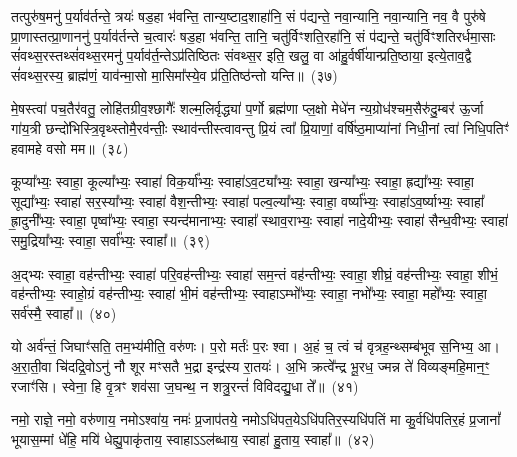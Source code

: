 तत्पुरु॑ष॒मनु॑ प॒र्याव॑र्तन्ते॒ त्रयः॑ षड॒हा भ॑वन्ति॒ तान्य॒ष्टाद॒शाहा॑नि॒ सं प॑द्यन्ते॒ नवा॒न्यानि॒ नवा॒न्यानि॒ नव॒ वै पुरु॑षे प्रा॒णास्तत्प्रा॒णाननु॑ प॒र्याव॑र्तन्ते च॒त्वारः॑ षड॒हा भ॑वन्ति॒ तानि॒ चतु॑र्विꣳशति॒रहा॑नि॒ सं प॑द्यन्ते॒ चतु॑र्विꣳशतिरर्धमा॒साः सं॑वथ्स॒रस्तथ्सं॑वथ्स॒रमनु॑ प॒र्याव॑र्त॒न्ते\-ऽप्र॑तिष्ठितः संवथ्स॒र इति॒ खलु॒ वा आ॑हु॒र्वर्\mbox{}षी॑यान्प्रति॒ष्ठाया॒ इत्ये॒ताव॒द्वै सं॑वथ्स॒रस्य॒ ब्राह्म॑णं॒ याव॑न्मा॒सो मा॒सिमा᳚स्ये॒व प्र॑ति॒तिष्ठ॑न्तो यन्ति॥~(३७)

{\anuvakamend[{वि॒राज॑मे॒तेन॑ द्वाद॒शावे॒ताव॒द्वा अ॒ष्टौ च॑}]}%

मे॒षस्त्वा॑ पच॒तैर॑वतु॒ लोहि॑तग्रीव॒श्छागैः᳚ शल्म॒लिर्वृद्ध्या॑ प॒र्णो ब्रह्म॑णा प्ल॒क्षो मेधे॑न न्य॒ग्रोध॑श्चम॒सैरु॑दु॒म्बर॑ ऊ॒र्जा गा॑य॒त्री छन्दो॑भिस्त्रि॒वृथ्स्तोमै॒रव॑न्तीः॒ स्थाव॑न्तीस्त्वावन्तु प्रि॒यं त्वा᳚ प्रि॒याणां॒ वर्\mbox{}षि॑ष्ठ॒माप्या॑नां निधी॒नां त्वा॑ निधि॒पतिꣳ॑ हवामहे वसो मम॥~(३८)

{\anuvakamend[{मे॒षः षट्त्रिꣳ॑शत्}]}%

कूप्या᳚भ्यः॒ स्वाहा॒ कूल्या᳚भ्यः॒ स्वाहा॑ विक॒र्या᳚भ्यः॒ स्वाहा॑\-ऽव॒ट्या᳚भ्यः॒ स्वाहा॒ खन्या᳚भ्यः॒ स्वाहा॒ ह्रद्या᳚भ्यः॒ स्वाहा॒ सूद्या᳚भ्यः॒ स्वाहा॑ सर॒स्या᳚भ्यः॒ स्वाहा॑ वैश॒न्तीभ्यः॒ स्वाहा॑ पल्व॒ल्या᳚भ्यः॒ स्वाहा॒ वर्ष्या᳚भ्यः॒ स्वाहा॑\-ऽव॒र्ष्याभ्यः॒ स्वाहा᳚ ह्रा॒दुनी᳚भ्यः॒ स्वाहा॒ पृष्वा᳚भ्यः॒ स्वाहा॒ स्यन्द॑मानाभ्यः॒ स्वाहा᳚ स्थाव॒राभ्यः॒ स्वाहा॑ नादे॒यीभ्यः॒ स्वाहा॑ सैन्ध॒वीभ्यः॒ स्वाहा॑ समु॒द्रिया᳚भ्यः॒ स्वाहा॒ सर्वा᳚भ्यः॒ स्वाहा᳚॥~(३९)

{\anuvakamend[{कूप्या᳚भ्यश्चत्वारि॒ꣳ॒शत्}]}%

अ॒द्भ्यः स्वाहा॒ वह॑न्तीभ्यः॒ स्वाहा॑ परि॒वह॑न्तीभ्यः॒ स्वाहा॑ सम॒न्तं वह॑न्तीभ्यः॒ स्वाहा॒ शीघ्रं॒ वह॑न्तीभ्यः॒ स्वाहा॒ शीभं॒ वह॑न्तीभ्यः॒ स्वाहो॒ग्रं वह॑न्तीभ्यः॒ स्वाहा॑ भी॒मं वह॑न्तीभ्यः॒ स्वाहा\-ऽम्भो᳚भ्यः॒ स्वाहा॒ नभो᳚भ्यः॒ स्वाहा॒ महो᳚भ्यः॒ स्वाहा॒ सर्व॑स्मै॒ स्वाहा᳚॥~(४०)

{\anuvakamend[{अ॒द्भ्य एका॒न्नत्रि॒ꣳ॒शत्}]}%

यो अर्व॑न्तं॒ जिघाꣳ॑सति॒ तम॒भ्य॑मीति॒ वरु॑णः। प॒रो मर्तः॑ प॒रः श्वा। अ॒हं च॒ त्वं च॑ वृत्रह॒न्थ्सम्ब॑भूव स॒निभ्य॒ आ। अ॒रा॒ती॒वा चि॑दद्रि॒वो\-ऽनु॑ नौ शूर मꣳसतै भ॒द्रा इन्द्र॑स्य रा॒तयः॑। अ॒भि क्रत्वे᳚न्द्र भू॒रध॒ ज्मन्न ते॑ विव्यङ्महि॒मान॒ꣳ॒ रजाꣳ॑सि। स्वेना॒ हि वृ॒त्रꣳ शव॑सा ज॒घन्थ॒ न शत्रु॒रन्तं॑ विविदद्यु॒धा ते᳚॥~(४१)

{\anuvakamend[{वि॒वि॒दद्द्वे च॑}]}%

नमो॒ राज्ञे॒ नमो॒ वरु॑णाय॒ नमो\-ऽश्वा॑य॒ नमः॑ प्र॒जा\-प॑तये॒ नमो\-ऽधि॑पत॒ये\-ऽधि॑पतिर॒स्यधि॑पतिं मा कु॒र्वधि॑पतिर॒हं प्र॒जानां᳚ भूयास॒म्मां धे॑हि॒ मयि॑ धेह्यु॒पाकृ॑ताय॒ स्वाहा\-ऽऽ\-ल॑ब्धाय॒ स्वाहा॑ हु॒ताय॒ स्वाहा᳚॥~(४२)

